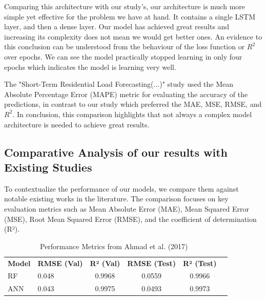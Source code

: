 Comparing this architecture with our study's, our architecture is much more simple yet effective for the problem we have at hand. It contains a single LSTM layer, and then a dense layer. Our model has achieved great results and increasing its complexity does not mean we would get better ones. An evidence to this conclusion can be understood from the behaviour of the loss function or \(R^2\) over epochs. We can see the model practically stopped learning in only four epochs which indicates the model is learning very well.

The "Short-Term Residential Load Forecasting(...)" study used the Mean Absolute Percentage Error (MAPE) metric for evaluating the accuracy of the predictions, in contrast to our study which preferred the MAE, MSE, RMSE, and \(R^2\). In conclusion, this comparison highlights that not always a complex model architecture is needed to achieve great results.


\subsection{Comparative Analysis of our results with Existing Studies}

To contextualize the performance of our models, we compare them against notable existing works in the literature. The comparison focuses on key evaluation metrics such as Mean Absolute Error (MAE), Mean Squared Error (MSE), Root Mean Squared Error (RMSE), and the coefficient of determination (R²).

\begin{table}[H]
\centering
\caption{Performance Metrics from Ahmad et al. (2017)~\cite{ahmad2017random}}
\begin{tabular}{llcccc}

 \textbf{Model} & \textbf{RMSE (Val)} & \textbf{R² (Val)} & \textbf{RMSE (Test)} & \textbf{R² (Test)} \\
RF & 0.048 & 0.9968 & 0.0559 & 0.9966 \\
ANN & 0.043 & 0.9975 & 0.0493 & 0.9973 \\
\end{tabular}
\label{tab:ahmad2017_results}
\end{table}

